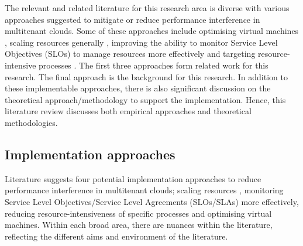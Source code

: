 The relevant and related literature for this research area is diverse with various approaches suggested to mitigate or reduce performance
interference in multitenant clouds. Some of these approaches include
optimising virtual machines \cite{steinder2007server}, scaling resources
generally \cite{lorido2014review}, improving the ability to monitor Service Level Objectives (SLOs) to
manage resources more effectively \cite{patel2009service} and targeting
resource-intensive processes \cite{chen2015cloudscope,maas2014case}. 
\newline\newline
The first three approaches form related work for this research. The final approach is the background for this research. In addition to these implementable approaches, there is also significant discussion on the theoretical approach/methodology to support the implementation. Hence, this literature review  discusses both empirical approaches and
theoretical methodologies.
\subsection{Implementation approaches}
Literature suggests four potential implementation approaches to reduce performance interference in multitenant clouds; scaling resources \cite{naskos2015dependable}, monitoring Service Level Objectives/Service Level Agreements (SLOs/SLAs) more effectively, reducing
resource-intensiveness of specific processes \cite{maas2018hardware} and
optimising virtual machines. Within each broad area, there are nuances within the literature, reflecting the different aims and environment of the literature.
